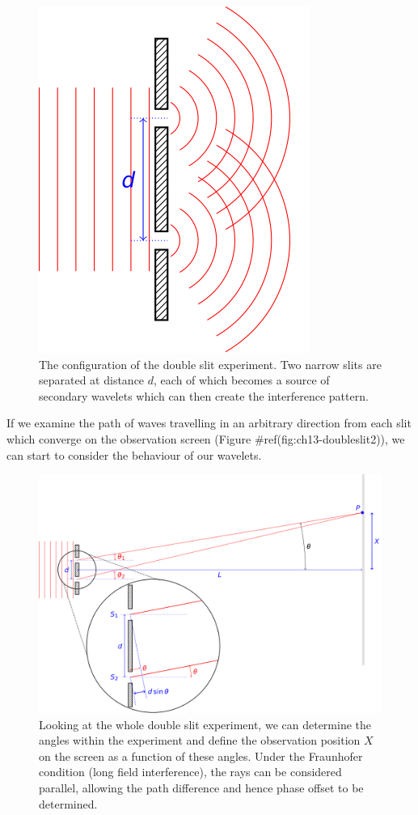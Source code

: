 \documentclass[
]{book}
\begin{document}
\begin{figure}

{\centering \includegraphics[width=0.7\linewidth]{visualisations/LaTeX/ch13-doubleslits} 

}

\caption{The configuration of the double slit experiment. Two narrow slits are separated at distance $d$, each of which becomes a source of secondary wavelets which can then create the interference pattern.}\label{fig:ch13-doubleslit1}
\end{figure}

If we examine the path of waves travelling in an arbitrary direction from each slit which converge on the observation screen (Figure \#ref(fig:ch13-doubleslit2)), we can start to consider the behaviour of our wavelets.

\begin{figure}

{\centering \includegraphics[width=0.7\linewidth]{visualisations/LaTeX/ch13-doubleslits2} 

}

\caption{Looking at the whole double slit experiment, we can determine the angles within the experiment and define the observation position $X$ on the screen as a function of these angles. Under the Fraunhofer condition (long field interference), the rays can be considered parallel, allowing the path difference and hence phase offset to be determined.}\label{fig:ch13-doubleslit2}
\end{figure}
\end{document}
